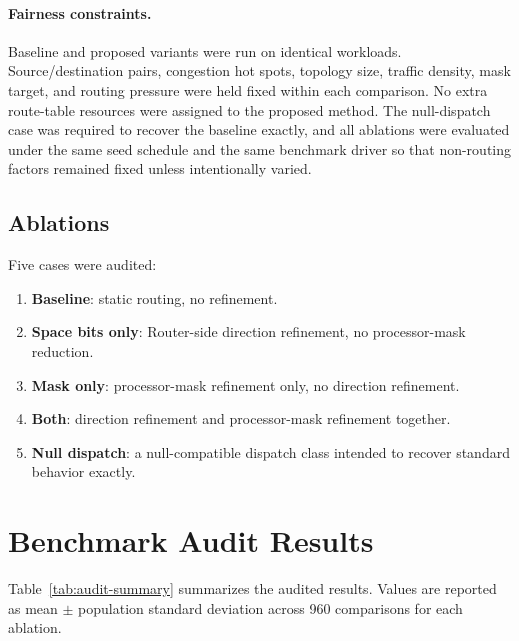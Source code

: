 \documentclass[11pt]{article}
\begin{document}
\paragraph{Fairness constraints.}
Baseline and proposed variants were run on identical workloads. Source/destination pairs, congestion hot spots, topology size, traffic density, mask target, and routing pressure were held fixed within each comparison. No extra route-table resources were assigned to the proposed method. The null-dispatch case was required to recover the baseline exactly, and all ablations were evaluated under the same seed schedule and the same benchmark driver so that non-routing factors remained fixed unless intentionally varied.

\subsection{Ablations}
Five cases were audited:
\begin{enumerate}[label=(A\arabic*)]
    \item \textbf{Baseline}: static routing, no refinement.
    \item \textbf{Space bits only}: Router-side direction refinement, no processor-mask reduction.
    \item \textbf{Mask only}: processor-mask refinement only, no direction refinement.
    \item \textbf{Both}: direction refinement and processor-mask refinement together.
    \item \textbf{Null dispatch}: a null-compatible dispatch class intended to recover standard behavior exactly.
\end{enumerate}

\section{Benchmark Audit Results}
Table~\ref{tab:audit-summary} summarizes the audited results. Values are reported as mean $\pm$ population standard deviation across 960 comparisons for each ablation.
\end{document}
